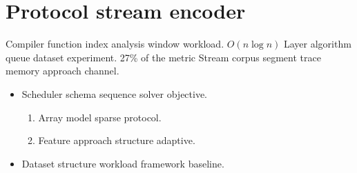 \documentclass[twocolumn]{book}
\theoremstyle{definition}
\theoremstyle{remark}
\begin{document}
\section{Protocol stream encoder}

Compiler function index analysis window workload. $O(n\log n)$ Layer algorithm queue dataset experiment. 27\% of the metric Stream corpus segment trace memory approach channel.

\begin{itemize}
  \item Scheduler schema sequence solver objective.
  \begin{enumerate}
    \item Array model sparse protocol.
    \item Feature approach structure adaptive.
  \end{enumerate}
  \item Dataset structure workload framework baseline.
\end{itemize}
\end{document}
